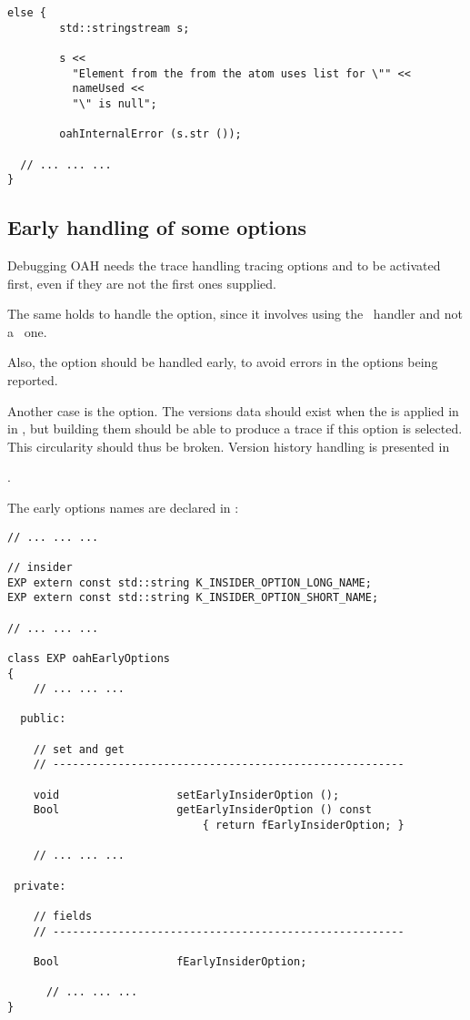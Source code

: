 {\begin{lstlisting}[language=CPlusPlus]
      else {
        std::stringstream s;

        s <<
          "Element from the from the atom uses list for \"" <<
          nameUsed <<
          "\" is null";

        oahInternalError (s.str ());

  // ... ... ...
}
\end{lstlisting}


\subsection{Early handling of some options}

Debugging OAH needs the trace handling tracing options  and  to be activated first, even if they are not the first ones supplied.

The same holds to handle the  option, since it involves using the \insider\ handler and not a \regular\ one.

Also, the  option should be handled early, to avoid errors in the options being reported.

Another case is the  option. The versions data should exist when the  is applied in  in , but building them should be able to produce a trace if this option is selected. This circularity  should thus be broken. Version history handling is presented in }.

The early options names are declared in :
\begin{lstlisting}[language=Terminal]
// ... ... ...

// insider
EXP extern const std::string K_INSIDER_OPTION_LONG_NAME;
EXP extern const std::string K_INSIDER_OPTION_SHORT_NAME;

// ... ... ...

class EXP oahEarlyOptions
{
	// ... ... ...

  public:

    // set and get
    // ------------------------------------------------------

    void                  setEarlyInsiderOption ();
    Bool                  getEarlyInsiderOption () const
                              { return fEarlyInsiderOption; }

	// ... ... ...

 private:

    // fields
    // ------------------------------------------------------

    Bool                  fEarlyInsiderOption;

	  // ... ... ...
}
\end{lstlisting}

